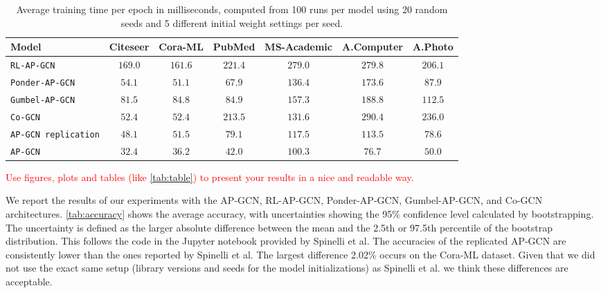\documentclass{gdl}
\begin{document}
\begin{table}[h]
    \small\sf\centering
    \caption{Average training time per epoch in milliseconds, computed from 100 runs per model using 20 random seeds and 5 different initial weight settings per seed.}
    \begin{tabular}{l c c c c c c}
        \toprule
        Model & Citeseer & Cora-ML & PubMed & MS-Academic & A.Computer & A.Photo   \\
        \midrule
        \texttt{RL-AP-GCN} &$169.0$&$161.6$&$221.4$&$279.0$&$279.8$&$206.1$  \\
        \texttt{Ponder-AP-GCN} &$54.1$&$51.1$&$67.9$&$136.4$&$173.6$&$87.9$   \\
        \texttt{Gumbel-AP-GCN} &$81.5$&$84.8$&$84.9$&$157.3$&$188.8$&$112.5$   \\
        \texttt{Co-GCN} &$52.4$&$52.4$&$213.5$&$131.6$&$290.4$&$236.0$  \\
        \texttt{AP-GCN replication} &$48.1$&$51.5$&$79.1$&$117.5$&$113.5$&$78.6$  \\
        \midrule
        \texttt{AP-GCN} & $32.4$ & $36.2$ & $42.0$ & $100.3$ & $76.7$ & $50.0$ \\
        \bottomrule 
    \end{tabular}
    \label{tab:time-per-epoch}
\end{table}

\textcolor{red}{Use figures, plots and tables (like \autoref{tab:table}) to present your results in a nice and readable way.}


We report the results of our experiments with the AP-GCN, RL-AP-GCN, Ponder-AP-GCN, Gumbel-AP-GCN, and Co-GCN architectures. \autoref{tab:accuracy} shows the average accuracy, with uncertainties showing the 95\% confidence level calculated by bootstrapping. The uncertainty is defined as the larger absolute difference between the mean and the 2.5th or 97.5th percentile of the bootstrap distribution. This follows the code in the Jupyter notebook provided by Spinelli et al. The accuracies of the replicated AP-GCN are consistently lower than the ones reported by Spinelli et al. The largest difference 2.02\% occurs on the Cora-ML dataset. Given that we did not use the exact same setup (library versions and seeds for the model initializations) as Spinelli et al. we think these differences are acceptable. 
\end{document}
